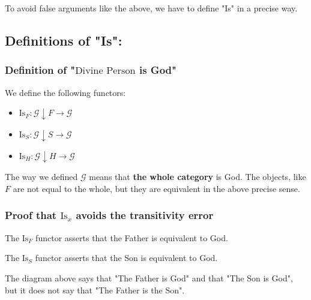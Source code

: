 \documentclass[11pt]{article}
\begin{document}
To avoid false arguments like the above, we have to define "Is" in a precise way.

\subsection{Definitions of "Is":}
\label{sec:def-is}

\subsubsection{Definition of "$\text{Divine Person}$ is God"}
\label{sec:def-divine-person}

We define the following functors:

\begin{itemize}
\item $\text{Is}_F : \mathcal{G}\downarrow F \to \mathcal{G}$
\item $\text{Is}_S : \mathcal{G}\downarrow S \to \mathcal{G}$
\item $\text{Is}_H : \mathcal{G}\downarrow H \to \mathcal{G}$
\end{itemize}

The way we defined $\mathcal{G}$ means that \textbf{the whole category} is God. The objects, like $F$ are not equal to the whole, but they are equivalent in the above precise sense.

\subsubsection{Proof that $\text{Is}_x$ avoids the transitivity error}
\label{sec:proof-no-transitivity}

The $\text{Is}_F$ functor asserts that the Father is equivalent to God.

The $\text{Is}_S$ functor asserts that the Son is equivalent to God.

\begin{center}
\end{center}

The diagram above says that "The Father is God" and that "The Son is God", but it does not say that "The Father is the Son".
\end{document}
